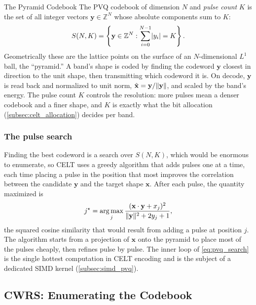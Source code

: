 \begin{concept}{The Pyramid Codebook}
  The PVQ codebook of dimension $N$ and \emph{pulse count} $K$ is the set of all
  integer vectors $\mathbf{y} \in \mathbb{Z}^N$ whose absolute components sum to
  $K$:
  \begin{equation}\label{eq:pvq_codebook}
    S(N, K) = \left\{\mathbf{y} \in \mathbb{Z}^N :
      \sum_{i=0}^{N-1} \lvert y_i\rvert = K\right\}.
  \end{equation}
  Geometrically these are the lattice points on the surface of an $N$-dimensional
  $L^1$ ball, the ``pyramid.'' A band's shape is coded by finding the codeword
  $\mathbf{y}$ closest in direction to the unit shape, then transmitting which
  codeword it is. On decode, $\mathbf{y}$ is read back and normalized to unit
  norm, $\hat{\mathbf{x}} = \mathbf{y}/\lVert\mathbf{y}\rVert$, and scaled by the
  band's energy. The pulse count $K$ controls the resolution: more pulses mean a
  denser codebook and a finer shape, and $K$ is exactly what the bit allocation
  (\cref{subsec:celt_allocation}) decides per band.
\end{concept}

\subsubsection{The pulse search}

Finding the best codeword is a search over $S(N,K)$, which would be enormous to
enumerate, so CELT uses a greedy algorithm that adds pulses one at a time, each
time placing a pulse in the position that most improves the correlation between
the candidate $\mathbf{y}$ and the target shape $\mathbf{x}$. After each pulse,
the quantity maximized is
\begin{equation}\label{eq:pvq_search}
  j^\star = \operatorname*{arg\,max}_j \frac{(\mathbf{x}\cdot\mathbf{y} + x_j)^2}
                           {\lVert\mathbf{y}\rVert^2 + 2y_j + 1},
\end{equation}
the squared cosine similarity that would result from adding a pulse at position
$j$. The algorithm starts from a projection of $\mathbf{x}$ onto the pyramid to
place most of the pulses cheaply, then refines pulse by pulse. The inner loop of
\cref{eq:pvq_search} is the single hottest computation in CELT encoding and is
the subject of a dedicated SIMD kernel (\cref{subsec:simd_pvq}).

\subsection{CWRS: Enumerating the Codebook}\label{subsec:cwrs}


